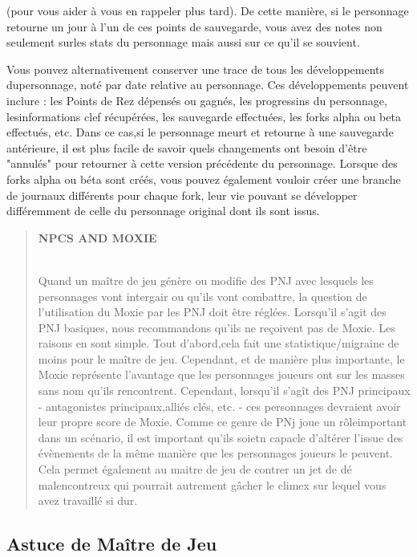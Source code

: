 (pour vous aider à vous en rappeler plus tard). De cette manière, si le personnage retourne un jour à l'un de ces points de sauvegarde, vous avez des notes non seulement surles stats du personnage mais aussi sur ce qu'il se souvient. 

Vous pouvez alternativement conserver une trace de tous les développements dupersonnage, noté par date relative au personnage. Ces développements peuvent inclure : les Points de Rez dépensés ou gagnés, les progressins du personnage, lesinformations clef récupérées, les sauvegarde effectuées, les forks alpha ou beta effectués, etc. Dans ce cas,si le personnage meurt et retourne à une sauvegarde antérieure, il est plus facile de savoir quels changements ont besoin d'être "annulés" pour retourner à cette version précédente du personnage. Lorsque des forks alpha ou béta sont créés, vous pouvez également vouloir créer une branche de journaux différents pour chaque fork, leur vie pouvant se développer différemment de celle du personnage original dont ils sont issus. 

\begin{quotation} \begin{large} \textbf{NPCS AND MOXIE} \end{large} \\ Quand un maître de jeu génère ou modifie des PNJ avec lesquels les personnages vont intergair ou qu'ils vont combattre, la question de l'utilisation du Moxie par les PNJ doit être réglées. Lorsqu'il s'agit des PNJ basiques, nous recommandons qu'ils ne reçoivent pas de Moxie. Les raisons en sont simple. Tout d'abord,cela fait une statistique/migraine de moins pour le maître de jeu. Cependant, et de manière plus importante, le Moxie représente l'avantage que les personnages joueurs ont sur les masses sans nom qu'ils rencontrent. Cependant, lorsqu'il s'agît des PNJ principaux - antagonistes principaux,alliés clés, etc. - ces personnages devraient avoir leur propre score de Moxie. Comme ce genre de PNj joue un rôleimportant dans un scénario, il est important qu'ils soietn capacle d'altérer l'issue des évènements de la même manière que les personnages joueurs le peuvent. Cela permet également au maitre de jeu de contrer un jet de dé malencontreux qui pourrait autrement gâcher le climex sur lequel vous avez travaillé si dur. \end{quotation} 

\subsection{Astuce de Maître de Jeu} 


